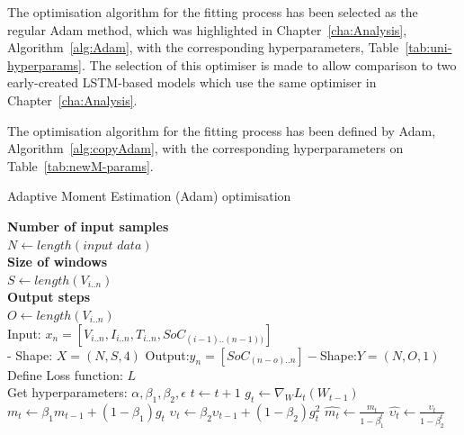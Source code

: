 %
%
{
The optimisation algorithm for the fitting process has been selected as the regular Adam method, which was highlighted in Chapter~\ref{cha:Analysis}, \mbox{Algorithm~\ref{alg:Adam}}, with the corresponding hyperparameters, \mbox{Table~\ref{tab:uni-hyperparams}}.
The selection of this optimiser is made to allow comparison to two early-created LSTM-based models which use the same optimiser in Chapter~\ref{cha:Analysis}.
}
{
The optimisation algorithm for the fitting process has been defined by Adam, \mbox{Algorithm~\ref{alg:copyAdam}}, with the corresponding hyperparameters on \mbox{Table~\ref{tab:newM-params}}.
\begin{algorithm}
    \caption{Adaptive Moment Estimation (Adam) optimisation}
    \begin{algorithmic}[1]
        \STATE \textbf{Number of input samples} \\ $N\gets length(\textit{input data})$\\
        \STATE \textbf{Size of windows} \\ $S\gets length(V_{i..n})$\\
        \STATE \textbf{Output steps} \\ $O\gets length(V_{i..n})$\\
        \STATE Input: $x_n = [V_{i..n}, I_{i..n}, T_{i..n}, SoC_{(i-1)..(n-1))}]$ \\
        - Shape: $X = (N, S, 4)$
        \STATE Output:$y_n = [SoC_{(n-o)..n}] - $Shape:$Y = (N, O, 1)$
        \STATE Define Loss function: $L$ \\
                Get hyperparameters: $\alpha, \beta_1, \beta_2, \epsilon$
        \STATE $t \gets t+1$
        \STATE $g_t \gets \nabla_W L_t (W_{t-1})$ 
        \STATE $m_t \gets \beta_1 m_{t-1}+(1-\beta_1) g_t $ 
        \STATE $\upsilon_t \gets \beta_2 \upsilon_{t-1}+ \left(1-\beta_2 \right)g^2_t $ 
        \STATE $\hat{m_t} \gets \frac{m_t}{1-\beta^t_1}$ 
        \STATE $\hat{\upsilon_t} \gets \frac{\upsilon_t}{1-\beta^t_2} $ 

\end{algorithmic}
\end{algorithm}}

